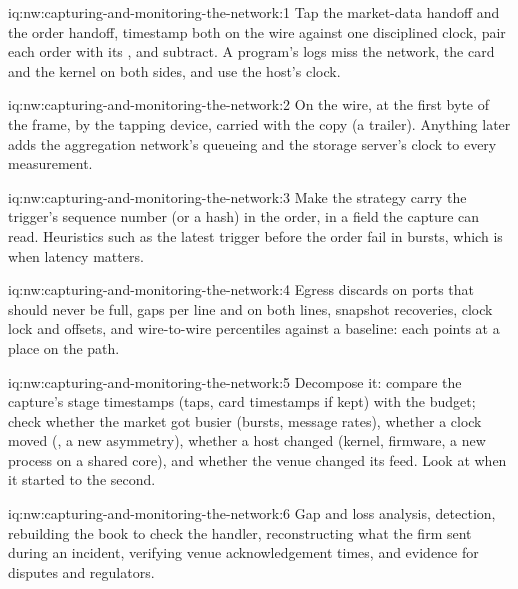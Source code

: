
\begin{solution}{iq:nw:capturing-and-monitoring-the-network:1}
Tap the market-data handoff and the order handoff, timestamp both on the wire against one disciplined clock, pair each order with its , and subtract. A program's logs miss the network, the card and the kernel on both sides, and use the host's clock.
\end{solution}

\begin{solution}{iq:nw:capturing-and-monitoring-the-network:2}
On the wire, at the first byte of the frame, by the tapping device, carried with the copy (a trailer). Anything later adds the aggregation
network's queueing and the storage server's clock to every measurement.
\end{solution}

\begin{solution}{iq:nw:capturing-and-monitoring-the-network:3}
Make the strategy carry the trigger's sequence number (or a hash) in the order, in a field the capture can read. Heuristics such as the
latest trigger before the order fail in bursts, which is when latency matters.
\end{solution}

\begin{solution}{iq:nw:capturing-and-monitoring-the-network:4}
Egress discards on ports that should never be full, gaps per line and on both lines, snapshot recoveries, clock lock and offsets, and
wire-to-wire percentiles against a baseline: each points at a place on the path.
\end{solution}

\begin{solution}{iq:nw:capturing-and-monitoring-the-network:5}
Decompose it: compare the capture's stage timestamps (taps, card timestamps if kept) with the budget; check whether the market got busier
(bursts, message rates), whether a clock moved (, a new asymmetry), whether a host changed (kernel, firmware, a new process on a
shared core), and whether the venue changed its feed. Look at when it started to the second.
\end{solution}

\begin{solution}{iq:nw:capturing-and-monitoring-the-network:6}
Gap and loss analysis,  detection, rebuilding the book to check the handler, reconstructing what the firm sent during an incident,
verifying venue acknowledgement times, and evidence for disputes and regulators.
\end{solution}
